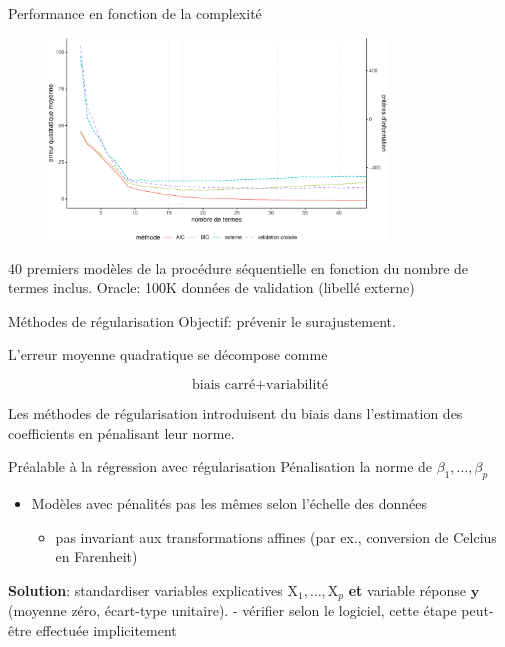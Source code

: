 \documentclass[
  ignorenonframetext,
]{beamer}
\providecommand{\tightlist}{%
  \setlength{\itemsep}{0pt}\setlength{\parskip}{0pt}}\usepackage{longtable,booktabs,array}
\begin{document}
\begin{frame}{Performance en fonction de la complexité}
\protect\hypertarget{performance-en-fonction-de-la-complexituxe9}{}
\begin{figure}

{\centering \includegraphics[width=0.8\textwidth,height=\textheight]{figures/fig-perfo-sequentiel.pdf}

}

\end{figure}

\footnotesize

40 premiers modèles de la procédure séquentielle en fonction du nombre
de termes inclus. Oracle: 100K données de validation (libellé externe)

\normalsize
\end{frame}

\begin{frame}{Méthodes de régularisation}
\protect\hypertarget{muxe9thodes-de-ruxe9gularisation}{}
Objectif: prévenir le surajustement.

L'erreur moyenne quadratique se décompose comme

\[ \text{biais carré} + \text{variabilité}\]

Les méthodes de régularisation introduisent du biais dans l'estimation
des coefficients en pénalisant leur norme.
\end{frame}

\begin{frame}{Préalable à la régression avec régularisation}
\protect\hypertarget{pruxe9alable-uxe0-la-ruxe9gression-avec-ruxe9gularisation}{}
Pénalisation la norme de \(\beta_1, \ldots, \beta_p\)

\begin{itemize}
\tightlist
\item
  Modèles avec pénalités pas les mêmes selon l'échelle des données

  \begin{itemize}
  \tightlist
  \item
    pas invariant aux transformations affines (par ex., conversion de
    Celcius en Farenheit)
  \end{itemize}
\end{itemize}

\textbf{Solution}: standardiser variables explicatives
\(\mathrm{X}_1, \ldots, \mathrm{X}_p\) \textbf{et} variable réponse
\(\boldsymbol{y}\) (moyenne zéro, écart-type unitaire). - vérifier selon
le logiciel, cette étape peut-être effectuée implicitement
\end{frame}
\end{document}
